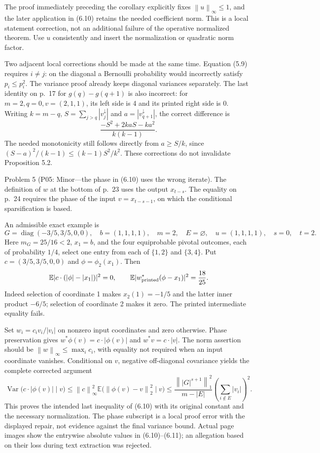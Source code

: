 \documentclass[10pt]{article}
\begin{document}
The proof immediately preceding the corollary explicitly fixes \(\left\lVert u\right\rVert_\infty\le1\), and the later application in (6.10) retains the needed coefficient norm. This is a local statement correction, not an additional failure of the operative normalized theorem. Use \(u\) consistently and insert the normalization or quadratic norm factor.\par
Two adjacent local corrections should be made at the same time. Equation (5.9) requires \(i\ne j\): on the diagonal a Bernoulli probability would incorrectly satisfy \(p_i\le p_i^2\). The variance proof already keeps diagonal variances separately. The last identity on p. 17 for \(g(q)-g(q+1)\) is also incorrect: for \(m=2,q=0,v=(2,1,1)\), its left side is 4 and its printed right side is 0. Writing \(k=m-q\), \(S=\sum_{j>q}|v_j^\downarrow|\) and \(a=|v_{q+1}^\downarrow|\), the correct difference is \[\frac{-S^2+2kaS-ka^2}{k(k-1)}.\] The needed monotonicity still follows directly from \(a\ge S/k\), since \((S-a)^2/(k-1)\le (k-1)S^2/k^2\). These corrections do not invalidate Proposition 5.2.\par
Problem 5 (P05: Minor—the phase in (6.10) uses the wrong iterate).  The definition of \(w\) at the bottom of p. 23 uses the output \(x_{t-s}\). The equality on p. 24 requires the phase of the input \(v=x_{t-s-1}\), on which the conditional sparsification is based.\par
An admissible exact example is \[G=\operatorname{diag}(-3/5,3/5,0,0),\quad
 b=(1,1,1,1),\quad m=2,\quad E=\varnothing,\quad
 u=(1,1,1,1),\quad s=0,\quad t=2.\] Here \(m_G=25/16<2\), \(x_1=b\), and the four equiprobable pivotal outcomes, each of probability \(1/4\), select one entry from each of \(\{1,2\}\) and \(\{3,4\}\). Put \(c=(3/5,3/5,0,0)\) and \(\phi=\phi_2(x_1)\). Then \[\mathbb E|c\cdot(|\phi|-|x_1|)|^2=0,\qquad
 \mathbb E|w_{\rm printed}^*(\phi-x_1)|^2=\frac{18}{25}.\] Indeed selection of coordinate 1 makes \(x_2(1)=-1/5\) and the latter inner product \(-6/5\); selection of coordinate 2 makes it zero. The printed intermediate equality fails.\par
Set \(w_i=c_i v_i/|v_i|\) on nonzero input coordinates and zero otherwise. Phase preservation gives \(w^*\phi(v)=c\cdot|\phi(v)|\) and \(w^*v=c\cdot|v|\). The norm assertion should be \(\left\lVert w\right\rVert_\infty\le\max_i c_i\), with equality not required when an input coordinate vanishes. Conditional on \(v\), negative off-diagonal covariance yields the complete corrected argument \[\operatorname{Var}\bigl(c\cdot|\phi(v)|\mid v\bigr)
 \le\left\lVert c\right\rVert_\infty^2
          \mathbb E\bigl(\left\lVert\phi(v)-v\right\rVert_2^2\mid v\bigr)
 \le\frac{\left\lVert|G|^{s+1}\right\rVert_1^2}{m-|E|}
       \left(\sum_{i\notin E}|v_i|\right)^2.\] This proves the intended last inequality of (6.10) with its original constant and the necessary normalization. The phase subscript is a local proof error with the displayed repair, not evidence against the final variance bound. Actual page images show the entrywise absolute values in (6.10)–(6.11); an allegation based on their loss during text extraction was rejected.\par
\end{document}

